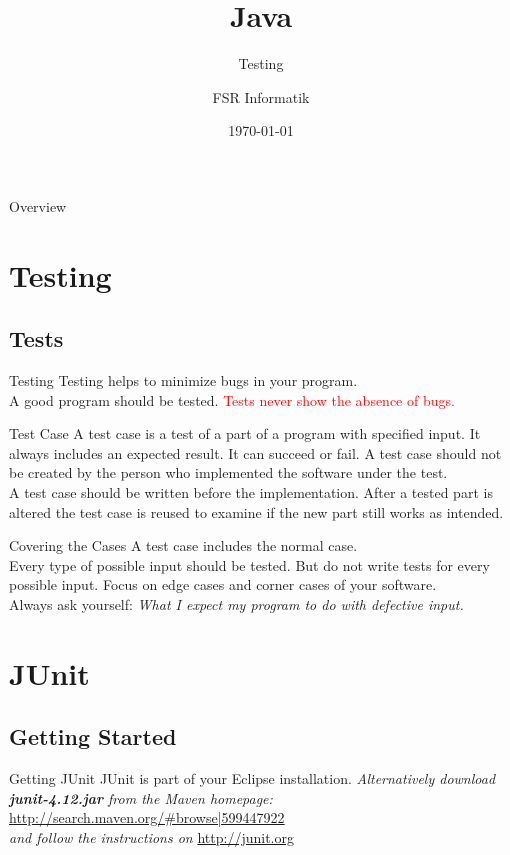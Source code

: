 

\title{Java}
\subtitle{Testing}
\author{FSR Informatik}
\date{\today}



\begin{frame}
\titlepage
\end{frame}

\begin{frame}{Overview}
\tableofcontents
\end{frame}

\section{Testing}
\subsection{Tests}
\begin{frame}{Testing}
	Testing helps to minimize bugs in your program. \\
	A good program should be tested.
	\vfill
	\textcolor{red}{Tests never show the absence of bugs.}
\end{frame}

\begin{frame}{Test Case}
	A test case is a test of a part of a program with specified input. 
	It always includes an expected result.
	It can succeed or fail.
	\vfill
	A test case should not be created by the person who implemented the software under the test. \\
	A test case should be written before the implementation.
	\vfill
	After a tested part is altered the test case is reused to examine if the new part still works as intended.
\end{frame}
\begin{frame}{Covering the Cases}
	A test case includes the normal case. \\
	Every type of possible input should be tested. But do not write tests for every possible input.
	\vfill
	Focus on edge cases and corner cases of your software. \\
	Always ask yourself: \emph{What I expect my program to do with defective input.}
\end{frame}


\section{JUnit}
\subsection{Getting Started}
\begin{frame}{Getting JUnit}
	JUnit is part of your Eclipse installation.
	\vfill
	\emph{Alternatively download \textbf{junit-4.12.jar} from the Maven homepage:}\\
	\url{http://search.maven.org/\#browse|599447922} \\
	\emph{and follow the instructions on} \url{http://junit.org}
\end{frame}

